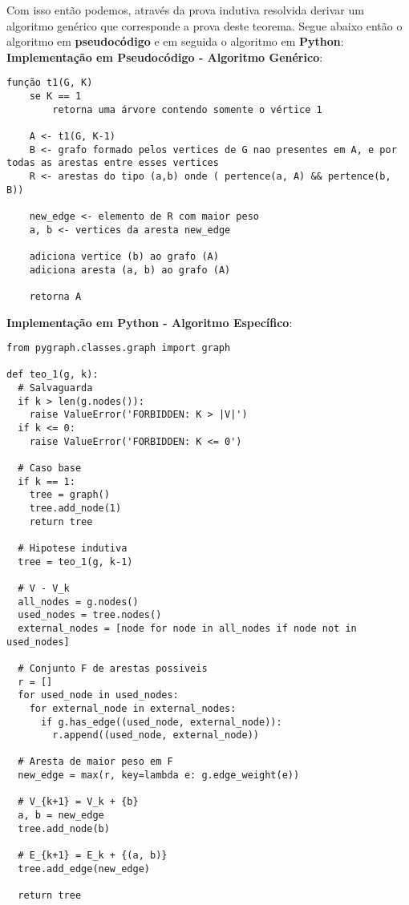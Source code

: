 \documentclass{article}
\begin{document}
Com isso então podemos, através da prova indutiva resolvida derivar um algoritmo genérico que corresponde a prova deste teorema. Segue abaixo então o algoritmo em \textbf{pseudocódigo} e em seguida o algoritmo em \textbf{Python}:\\

\textbf{Implementação em Pseudocódigo - Algoritmo Genérico}:

{\color{ogreen}
\begin{verbatim}
função t1(G, K)
    se K == 1
        retorna uma árvore contendo somente o vértice 1

    A <- t1(G, K-1)
    B <- grafo formado pelos vertices de G nao presentes em A, e por todas as arestas entre esses vertices
    R <- arestas do tipo (a,b) onde ( pertence(a, A) && pertence(b, B))

    new_edge <- elemento de R com maior peso
    a, b <- vertices da aresta new_edge

    adiciona vertice (b) ao grafo (A)
    adiciona aresta (a, b) ao grafo (A)

    retorna A
\end{verbatim}
}

\textbf{Implementação em Python - Algoritmo Específico}:

{\color{red}
\begin{verbatim}
from pygraph.classes.graph import graph

def teo_1(g, k):
  # Salvaguarda
  if k > len(g.nodes()):
    raise ValueError('FORBIDDEN: K > |V|')
  if k <= 0:
    raise ValueError('FORBIDDEN: K <= 0')

  # Caso base
  if k == 1:
    tree = graph()
    tree.add_node(1)
    return tree

  # Hipotese indutiva
  tree = teo_1(g, k-1)

  # V - V_k
  all_nodes = g.nodes()
  used_nodes = tree.nodes()
  external_nodes = [node for node in all_nodes if node not in used_nodes]

  # Conjunto F de arestas possiveis
  r = []
  for used_node in used_nodes:
    for external_node in external_nodes:
      if g.has_edge((used_node, external_node)):
        r.append((used_node, external_node))

  # Aresta de maior peso em F
  new_edge = max(r, key=lambda e: g.edge_weight(e))

  # V_{k+1} = V_k + {b}
  a, b = new_edge
  tree.add_node(b)

  # E_{k+1} = E_k + {(a, b)}
  tree.add_edge(new_edge)

  return tree
\end{verbatim}
}
\end{document}
